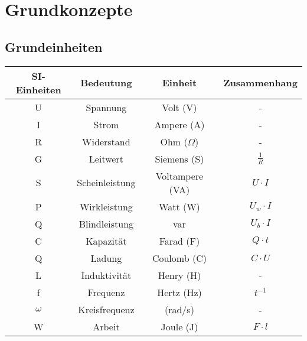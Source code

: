 \chapter{Grundkonzepte}

\section{Grundeinheiten}

\setlength{\tabcolsep}{4pt} %
\renewcommand{\arraystretch}{1.05} %
\begin{table}[!htb]
    \centering
    \begin{tabular}{|c|c|c|c|}
        \hline
        \textbf{SI-Einheiten} & \textbf{Bedeutung}        & \textbf{Einheit} & \textbf{Zusammenhang} \\ \hline
        U               & Spannung                  & Volt (V)         & -                     \\
        I               & Strom                     & Ampere (A)       & -                     \\
        R               & Widerstand                & Ohm ($\Omega$)   & -                     \\
        G               & Leitwert                  & Siemens (S)      & $\frac{1}{R}$         \\
        S               & Scheinleistung            & Voltampere (VA)  & $U\cdot I$            \\
        P               & Wirkleistung              & Watt (W)         & $U_w\cdot I$            \\
        Q               & Blindleistung             & var              & $U_b\cdot I$            \\
        C               & Kapazität                 & Farad (F)        & $Q \cdot t$            \\
        Q               & Ladung                    & Coulomb (C)      & $C \cdot U$           \\
        L               & Induktivität              & Henry (H)        & -                     \\
        f               & Frequenz                  & Hertz (Hz)       & $t^{-1}$              \\ 
        $\omega$        & Kreisfrequenz             & (rad/s)          & -           \\
        W               & Arbeit                    & Joule (J)        & $F \cdot l$           \\

\end{tabular}
\end{table}
